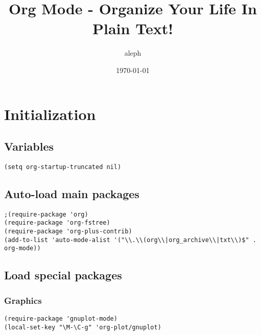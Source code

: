 \documentclass[11pt]{scrartcl}
\author{aleph}
\date{\today}
\title{Org Mode - Organize Your Life In Plain Text!}
\begin{document}
\maketitle
\setcounter{tocdepth}{3}
\tableofcontents


\section{Initialization}
\label{sec:orgheadline5}
\subsection{Variables}
\label{sec:orgheadline1}
\begin{verbatim}
(setq org-startup-truncated nil)
\end{verbatim}

\subsection{Auto-load main packages}
\label{sec:orgheadline2}

\begin{verbatim}
;(require-package 'org)
(require-package 'org-fstree)
(require-package 'org-plus-contrib)
(add-to-list 'auto-mode-alist '("\\.\\(org\\|org_archive\\|txt\\)$" . org-mode))
\end{verbatim}

\subsection{Load special packages}
\label{sec:orgheadline4}
\subsubsection{Graphics}
\label{sec:orgheadline3}
\begin{verbatim}
(require-package 'gnuplot-mode)
(local-set-key "\M-\C-g" 'org-plot/gnuplot)
\end{verbatim}
\end{document}
